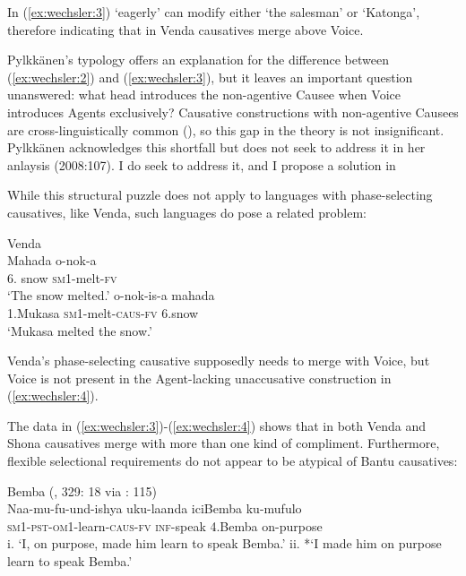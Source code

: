 \documentclass[output=paper,modfonts,nonflat,colorlinks,citecolor=brown]{langsci/langscibook}
\begin{document}
In (\ref{ex:wechsler:3}) ‘eagerly’ can modify either ‘the salesman’ or ‘Katonga’, therefore indicating that in Venda causatives merge above Voice.  



Pylkkänen’s typology offers an explanation for the difference between (\ref{ex:wechsler:2}) and (\ref{ex:wechsler:3}), but it leaves an important question unanswered: what head introduces the non-agentive Causee when Voice introduces Agents exclusively? Causative constructions with non-agentive Causees are cross-linguistically common (\citealt{Kulikov2001,Kittilä2013}), so this gap in the theory is not insignificant. Pylkkänen acknowledges this shortfall but does not seek to address it in her anlaysis (2008:107). I do seek to address it, and I propose a solution in   



While this structural puzzle does not apply to languages with phase-selecting causatives, like Venda, such languages do pose a related problem:


\ea\label{ex:wechsler:4}
Venda \citet[2]{Pylkkänen2008}\\
\ea
\gll Mahada  {{o-nok-a}} \\
6. snow  {\textsc{sm1}{}-melt-\textsc{fv} }\\
\glt `The snow melted.'
\ex 
{}  {{o-nok-is-a} } {mahada}\\
 {1.Mukasa}   {\textsc{sm1}{}-melt-\textsc{caus}{}-\textsc{fv} }  6.snow\\
\glt `Mukasa melted the snow.'
\z
\z

Venda’s phase-selecting causative supposedly needs to merge with Voice, but Voice is not present in the Agent-lacking unaccusative construction in (\ref{ex:wechsler:4}).

The data in (\ref{ex:wechsler:3})-(\ref{ex:wechsler:4}) shows that in both Venda and Shona causatives merge with more than one kind of compliment. Furthermore, flexible selectional requirements do not appear to be atypical of Bantu causatives: 

\ea\label{ex:wechsler:5}
{Bemba (\citealt{Givón1976}, 329: 18 via \citealt{Pylkkänen2008}: 115)}\\
{Naa-mu-fu-und-ishya} {uku-laanda} {iciBemba} {ku-mufulo}\\
\textsc{sm}1\textsc{{}-pst-om1}{}-learn-\textsc{caus-fv}  \textsc{inf-}speak  4.Bemba  on-purpose\\
\glt i. ‘I, on purpose, made him learn to speak Bemba.’
\glt ii. *‘I made him on purpose learn to speak Bemba.'
\z
\end{document}
